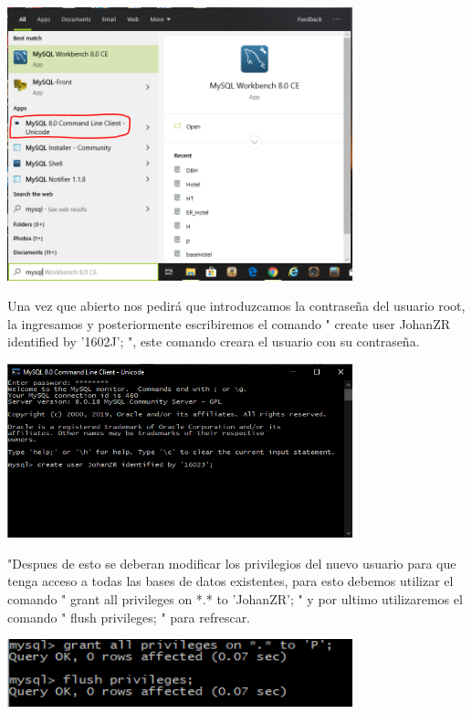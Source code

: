 \documentclass[12pt]{article}
\begin{document}
\begin{flushleft}
\vspace{0.5cm}
\begin{center}
\includegraphics[width=10cm]{crearUsuario1.png}
\end{center}
\vspace{0.5cm}

\textsf{Una vez que abierto nos pedirá que introduzcamos la contraseña del usuario root, la ingresamos y posteriormente escribiremos el comando " create user JohanZR identified by '1602J'; ", este comando creara el usuario con su contraseña.}

\vspace{0.5cm}
\begin{center}
\includegraphics[width=10cm]{crearUsuario2.png}
\end{center}
\vspace{0.5cm}

\textsf{"Despues de esto se deberan modificar los privilegios del nuevo usuario para que tenga acceso a todas las bases de datos existentes, para esto debemos utilizar el comando " grant all privileges on *.* to 'JohanZR'; " y por ultimo utilizaremos el comando " flush privileges; " para refrescar.}

\vspace{0.5cm}
\begin{center}
\includegraphics[width=10cm]{crearUsuario3.png}
\end{center}
\vspace{0.5cm}


\end{flushleft}
\end{document}
